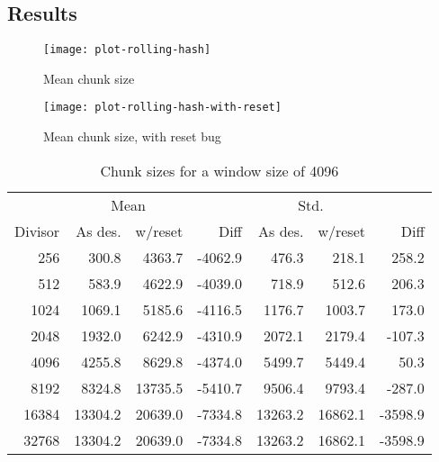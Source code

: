 \subsection{Results}

\begin{figure}[p]
  \caption{Mean chunk size}
  \label{plot-rolling-hash}
  \centering
    \texttt{[image: plot-rolling-hash]}
\end{figure}

\begin{figure}[p]
  \caption{Mean chunk size, with reset bug}
  \label{plot-rolling-hash-with-reset}
  \centering
    \texttt{[image: plot-rolling-hash-with-reset]}
\end{figure}

%

%

\begin{table}
    \caption{Chunk sizes for a window size of 4096}
    \label{chunk-size-table}
    \begin{tabular}{r | r r r | r r r}
        & \multicolumn{2}{c}{Mean} & & \multicolumn{2}{c}{Std.} & \\
        Divisor & As des. & w/reset & Diff & As des. & w/reset & Diff \\
        \midrule
    256 &    300.8 &   4363.7 &  -4062.9 &   476.3 &   218.1 &   258.2 \\
    512 &    583.9 &   4622.9 &  -4039.0 &   718.9 &   512.6 &   206.3 \\
   1024 &   1069.1 &   5185.6 &  -4116.5 &  1176.7 &  1003.7 &   173.0 \\
   2048 &   1932.0 &   6242.9 &  -4310.9 &  2072.1 &  2179.4 &  -107.3 \\
   4096 &   4255.8 &   8629.8 &  -4374.0 &  5499.7 &  5449.4 &    50.3 \\
   8192 &   8324.8 &  13735.5 &  -5410.7 &  9506.4 &  9793.4 &  -287.0 \\
  16384 &  13304.2 &  20639.0 &  -7334.8 & 13263.2 & 16862.1 & -3598.9 \\
  32768 &  13304.2 &  20639.0 &  -7334.8 & 13263.2 & 16862.1 & -3598.9 \\
    \end{tabular}
\end{table}

